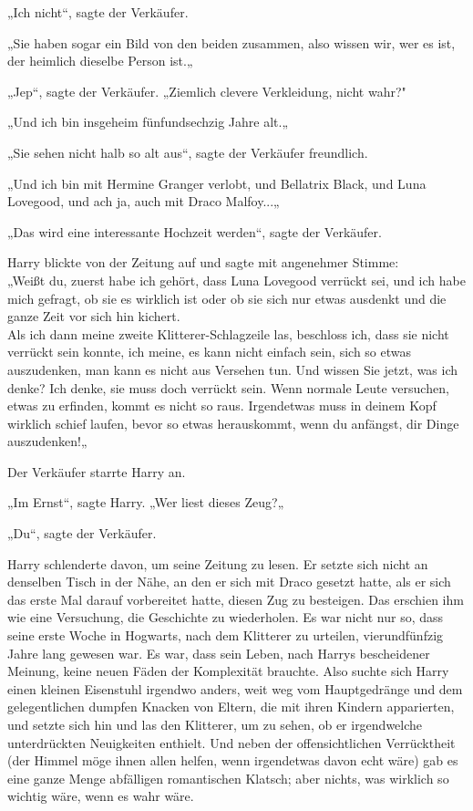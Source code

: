 {„Ich nicht“, sagte der Verkäufer.

„Sie haben sogar ein Bild von den beiden zusammen, also wissen wir, wer es ist, der heimlich dieselbe Person ist.„

„Jep“, sagte der Verkäufer. „Ziemlich clevere Verkleidung, nicht wahr?"

„Und ich bin insgeheim fünfundsechzig Jahre alt.„

„Sie sehen nicht halb so alt aus“, sagte der Verkäufer freundlich.

„Und ich bin mit Hermine Granger verlobt, und Bellatrix Black, und Luna Lovegood, und ach ja, auch mit Draco Malfoy...„

„Das wird eine interessante Hochzeit werden“, sagte der Verkäufer.

Harry blickte von der Zeitung auf und sagte mit angenehmer Stimme:\\ „Weißt du, zuerst habe ich gehört, dass Luna Lovegood verrückt sei, und ich habe mich gefragt, ob sie es wirklich ist oder ob sie sich nur etwas ausdenkt und die ganze Zeit vor sich hin kichert.\\ Als ich dann meine zweite Klitterer-Schlagzeile las, beschloss ich, dass sie nicht verrückt sein konnte, ich meine, es kann nicht einfach sein, sich so etwas auszudenken, man kann es nicht aus Versehen tun. Und wissen Sie jetzt, was ich denke? Ich denke, sie muss doch verrückt sein. Wenn normale Leute versuchen, etwas zu erfinden, kommt es nicht so raus. Irgendetwas muss in deinem Kopf wirklich schief laufen, bevor so etwas herauskommt, wenn du anfängst, dir Dinge auszudenken!„

Der Verkäufer starrte Harry an.

„Im Ernst“, sagte Harry. „Wer liest dieses Zeug?„

„Du“, sagte der Verkäufer.

Harry schlenderte davon, um seine Zeitung zu lesen. Er setzte sich nicht an denselben Tisch in der Nähe, an den er sich mit Draco gesetzt hatte, als er sich das erste Mal darauf vorbereitet hatte, diesen Zug zu besteigen. Das erschien ihm wie eine Versuchung, die Geschichte zu wiederholen. Es war nicht nur so, dass seine erste Woche in Hogwarts, nach dem Klitterer zu urteilen, vierundfünfzig Jahre lang gewesen war. Es war, dass sein Leben, nach Harrys bescheidener Meinung, keine neuen Fäden der Komplexität brauchte. Also suchte sich Harry einen kleinen Eisenstuhl irgendwo anders, weit weg vom Hauptgedränge und dem gelegentlichen dumpfen Knacken von Eltern, die mit ihren Kindern apparierten, und setzte sich hin und las den Klitterer, um zu sehen, ob er irgendwelche unterdrückten Neuigkeiten enthielt. Und neben der offensichtlichen Verrücktheit (der Himmel möge ihnen allen helfen, wenn irgendetwas davon echt wäre) gab es eine ganze Menge abfälligen romantischen Klatsch; aber nichts, was wirklich so wichtig wäre, wenn es wahr wäre.

}
